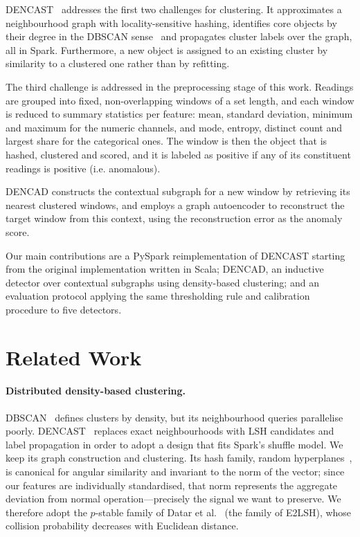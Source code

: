 \documentclass{article}
\begin{document}
DENCAST~\cite{corizzo2019dencast} addresses the first two challenges for clustering. It
approximates a neighbourhood graph with locality-sensitive hashing, identifies core
objects by their degree in the DBSCAN sense~\cite{ester1996dbscan} and propagates cluster
labels over the graph, all in Spark. Furthermore, a new object is assigned to an existing cluster
by similarity to a clustered one rather than by refitting.

The third challenge is addressed in the preprocessing stage of this work.
Readings are grouped into fixed, non-overlapping windows of a set length, and each window is reduced to summary statistics per feature:
mean, standard deviation, minimum and maximum for the numeric channels, and mode, entropy, distinct count and largest share for the categorical ones. 
The window is then the object that is hashed, clustered and scored, and it is labeled as positive if any of its constituent readings is positive (i.e. anomalous).

DENCAD constructs the contextual subgraph for a new window by retrieving its nearest clustered windows, 
and employs a graph autoencoder to reconstruct the target window from this context, using the reconstruction error as the anomaly score.

Our main contributions are a PySpark reimplementation of DENCAST starting from the original implementation written in Scala; DENCAD, an inductive detector
over contextual subgraphs using density-based clustering; and an evaluation protocol applying the same
thresholding rule and calibration procedure to five detectors.

\section{Related Work}

\paragraph{Distributed density-based clustering.} DBSCAN~\cite{ester1996dbscan} defines clusters by density, 
but its neighbourhood queries parallelise poorly.
DENCAST~\cite{corizzo2019dencast} replaces exact neighbourhoods with LSH candidates and
label propagation in order to adopt a design that fits Spark's shuffle model. We keep
its graph construction and clustering. Its hash family, random hyperplanes~\cite{charikar2002simhash}, is canonical for angular similarity
and invariant to the norm of the vector; since our features are individually standardised, that norm represents the aggregate deviation from normal operation---precisely the signal we want to preserve.
We therefore adopt the $p$-stable family of Datar et al.~\cite{datar2004pstable} (the family of E2LSH), whose collision probability decreases with Euclidean distance.
\end{document}
